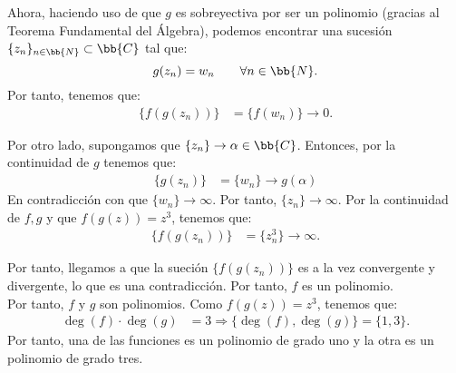 \documentclass[12pt]{article}
\begin{document}
\begin{ejercicio}[2.5 puntos]
        Ahora, haciendo uso de que $g$ es sobreyectiva por ser un polinomio (gracias al Teorema Fundamental del Álgebra), podemos encontrar una sucesión $\{z_n\}_{n\in \bb{N}}\subset \bb{C}$ tal que:
        \begin{equation*}
            g(z_n) = w_n\qquad \forall n\in \bb{N}.
        \end{equation*}
        Por tanto, tenemos que:
        \begin{align*}
            \{f(g(z_n))\} &= \{f(w_n)\} \to 0.
        \end{align*}

        Por otro lado, supongamos que $\{z_n\}\to \alpha\in \bb{C}$. Entonces, por la continuidad de $g$ tenemos que:
        \begin{align*}
            \{g(z_n)\} &= \{w_n\} \to g(\alpha)
        \end{align*}
        En contradicción con que $\{w_n\}\to \infty$. Por tanto, $\{z_n\}\to \infty$. Por la continuidad de $f, g$ y que $f(g(z))=z^3$, tenemos que:
        \begin{align*}
            \{f(g(z_n))\} &= \{z_n^3\} \to \infty.
        \end{align*}

        Por tanto, llegamos a que la sueción $\{f(g(z_n))\}$ es a la vez convergente y divergente, lo que es una contradicción. Por tanto, $f$ es un polinomio.\\

        Por tanto, $f$ y $g$ son polinomios. Como $f(g(z))=z^3$, tenemos que:
        \begin{align*}
            \deg(f)\cdot \deg(g) &= 3
            \Longrightarrow
            \{\deg(f), \deg(g)\} = \{1, 3\}.
        \end{align*}
        Por tanto, una de las funciones es un polinomio de grado uno y la otra es un polinomio de grado tres.
    \end{ejercicio}
    
    
\end{document}
